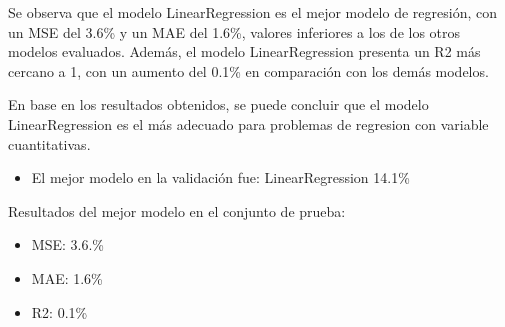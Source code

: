 Se observa que el modelo LinearRegression es el mejor modelo de regresión, con un MSE del 3.6\% y un MAE del 1.6\%, valores inferiores a los de los otros modelos evaluados. Además, el modelo LinearRegression presenta un R2 más cercano a 1, con un aumento del 0.1\% en comparación con los demás modelos.

En base en los resultados obtenidos, se puede concluir que el modelo LinearRegression es el más adecuado para problemas de regresion con variable cuantitativas.

\begin{itemize}
    \item El mejor modelo en la validación fue: LinearRegression 14.1\%
\end{itemize}

Resultados del mejor modelo en el conjunto de prueba:

\begin{itemize}
    \item MSE: 3.6.\%
    \item MAE: 1.6\%
    \item R2: 0.1\%
\end{itemize}